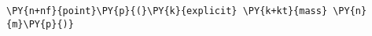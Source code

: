 \begin{Verbatim}[commandchars=\\\{\}]
    \PY{n+nf}{point}\PY{p}{(}\PY{k}{explicit} \PY{k+kt}{mass} \PY{n}{m}\PY{p}{)}
\end{Verbatim}
